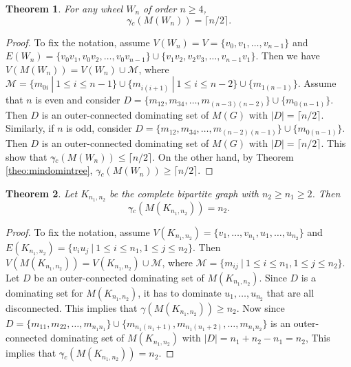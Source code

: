 \documentclass[a4paper,12pt, reqno]{amsart}
\newtheorem{Theorem}{Theorem}[section]
\begin{document}
\begin{Theorem} \label{OUTERWN} For any wheel $W_n$ of order $n\geq 4$, 
	$$\gamma{\tilde{}} _{c}(M(W_{n}))= \lceil n/2\rceil .$$
\end{Theorem}
\begin{proof}
	To fix the notation, assume $V(W_n)=V=\{v_0,v_1,\dots, v_{n-1}\}$ and $E(W_n)=\{v_0v_1,v_0v_2,\dots, v_0v_{n-1}\}\cup\{v_1v_2, v_2v_3,\dots,v_{n-1}v_1\}$. Then we have $V(M(W_n))=V(W_n)\cup \mathcal{M}$, where $\mathcal{M}=\{ m_{0i}~|~1\leq i \leq n-1 \}\cup\{ m_{i(i+1)}~|~1\leq i \leq n-2 \}\cup\{m_{1(n-1)}\}$. %
	Assume that $n$ is even and consider $D=\{m_{12}, m_{34}, \dots, m_{(n-3)(n-2)}\} \cup \{m_{0(n-1)}\}$. Then $D$ is an outer-connected dominating set of $M(G)$ with $|D|=\lceil n/2\rceil$. Similarly, if $n$ is odd, consider $D=\{m_{12}, m_{34}, \dots, m_{(n-2)(n-1)}\} \cup \{m_{0(n-1)}\}$. Then $D$ is an outer-connected dominating set of $M(G)$ with $|D|=\lceil n/2\rceil$. This show that $\gamma{\tilde{}} _{c}(M(W_{n}))\leq \lceil n/2\rceil$. On the other hand, by Theorem \ref{theo:mindomintree}, $\gamma{\tilde{}} _{c}(M(W_{n}))\geq \lceil n/2\rceil .$
\end{proof}
\begin{Theorem}\label{outcompletebipartitegr}
	Let $K_{n_1,n_2}$ be the complete bipartite graph with $n_2\geq n_1 \geq 2$. Then $$\gamma{\tilde{}} _{c}(M(K_{n_1,n_2}))= n_2.$$
\end{Theorem}
\begin{proof}  To fix the notation, assume $V(K_{n_1,n_2})=\{v_1,\dots, v_{n_1},u_1,\dots, u_{n_2}\}$ and $E(K_{n_1,n_2})=\{v_iu_j ~|~1\leq i \leq n_1, 1\leq j \leq n_2\}$. Then $V(M(K_{n_1,n_2}))=V(K_{n_1,n_2})\cup \mathcal{M}$, where
	$\mathcal{M}=\{ m_{ij}~|~1\leq i \leq n_1, 1\leq j \leq n_2 \}. $
Let $D$ be an outer-connected dominating set of $M(K_{n_1,n_2})$. 	
Since $D$ is a dominating set for $M(K_{n_1,n_2})$, it has to dominate $u_1,\dots, u_{n_2}$ that are all disconnected. This implies that $\gamma(M(K_{n_1,n_2}))\ge n_2$. Now since $D=\{m_{11},m_{22},\dots, m_{n_1n_1}\}\cup\{m_{n_1(n_1+1)}, m_{n_1(n_1+2)},\dots, m_{n_1n_2}\}$ is an outer-connected dominating set of $M(K_{n_1,n_2})$ with
	 $|D|=n_1+n_2-n_1=n_2$, This implies that 
	 $\gamma{\tilde{}} _{c}(M(K_{n_1,n_2}))= n_2.$
\end{proof}

\end{document}
